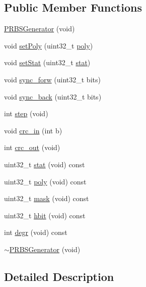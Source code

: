 \subsection*{\-Public \-Member \-Functions}
\begin{DoxyCompactItemize}
\item 
\hyperlink{classPRBSGenerator_ac503ed16e187261a8d724a02c231b11f}{\-P\-R\-B\-S\-Generator} (void)
\item 
void \hyperlink{classPRBSGenerator_a177cbca8f3cc1da63b4a29bc50cf2ad9}{set\-Poly} (uint32\-\_\-t \hyperlink{classPRBSGenerator_a19a3b9cb35dbff18b83d34bcafe22e05}{poly})
\item 
void \hyperlink{classPRBSGenerator_a5a5792cabc8312d00ed83decfb1c205a}{set\-Stat} (uint32\-\_\-t \hyperlink{classPRBSGenerator_ac72b113883fbfb329e105e34229cfd48}{stat})
\item 
void \hyperlink{classPRBSGenerator_aa72a859590fc719a74999da624824057}{sync\-\_\-forw} (uint32\-\_\-t bits)
\item 
void \hyperlink{classPRBSGenerator_a4cea29dcf49bc94d68b5673b9e37cc9f}{sync\-\_\-back} (uint32\-\_\-t bits)
\item 
int \hyperlink{classPRBSGenerator_a2c8b9d44afcef8dae17f7363ac1042a4}{step} (void)
\item 
void \hyperlink{classPRBSGenerator_afe70bb6ab4a6d59e58879ae38ebb9eed}{crc\-\_\-in} (int b)
\item 
int \hyperlink{classPRBSGenerator_a6a4ee8647635273b6709ee47eec55666}{crc\-\_\-out} (void)
\item 
uint32\-\_\-t \hyperlink{classPRBSGenerator_ac72b113883fbfb329e105e34229cfd48}{stat} (void) const 
\item 
uint32\-\_\-t \hyperlink{classPRBSGenerator_a19a3b9cb35dbff18b83d34bcafe22e05}{poly} (void) const 
\item 
uint32\-\_\-t \hyperlink{classPRBSGenerator_a3631d484226638d2a2d82e41394ee0be}{mask} (void) const 
\item 
uint32\-\_\-t \hyperlink{classPRBSGenerator_a9a13fad9b0e1b7bb19ddebc6e47e001b}{hbit} (void) const 
\item 
int \hyperlink{classPRBSGenerator_a817102ac5bb77f9af0665b595d54990a}{degr} (void) const 
\item 
\hyperlink{classPRBSGenerator_a3f52fa0d989363782e0363c3117fb1a1}{$\sim$\-P\-R\-B\-S\-Generator} (void)
\end{DoxyCompactItemize}


\subsection{\-Detailed \-Description}


